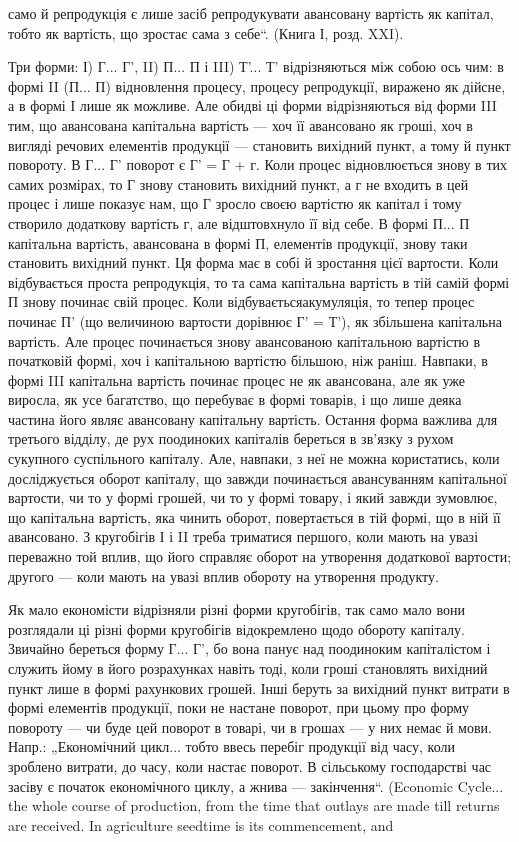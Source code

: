 само й репродукція є лише засіб репродукувати авансовану вартість
як капітал, тобто як вартість, що зростає сама з себе“. (Книга І,
розд. XXI).

Три форми: І) Г... Г', II) П... П і III) Т'... Т' відрізняються між
собою ось чим: в формі II (П... П) відновлення процесу, процесу репродукції,
виражено як дійсне, а в формі І лише як можливе. Але обидві ці
форми відрізняються від форми III тим, що авансована капітальна вартість
— хоч її авансовано як гроші, хоч в вигляді речових елементів продукції
— становить вихідний пункт, а тому й пункт повороту. В Г... Г' поворот
є Г' = Г + г. Коли процес відновлюється знову в тих самих розмірах,
то Г знову становить вихідний пункт, а г не входить в цей процес і лише
показує нам, що Г зросло своєю вартістю як капітал і тому створило додаткову
вартість г, але відштовхнуло її від себе. В формі П... П капітальна
вартість, авансована в формі П, елементів продукції, знову таки
становить вихідний пункт. Ця форма має в собі й зростання цієї вартости.
Коли відбувається проста репродукція, то та сама капітальна вартість
в тій самій формі П знову починає свій процес. Коли відбуваєтьсяакумуляція,
то тепер процес починає П' (що величиною вартости дорівнює
Г' = Т'), як збільшена капітальна вартість. Але процес починається знову
авансованою капітальною вартістю в початковій формі, хоч і капітальною
вартістю більшою, ніж раніш. Навпаки, в формі III капітальна вартість
починає процес не як авансована, але як уже виросла, як усе багатство,
що перебуває в формі товарів, і що лише деяка частина його являє
авансовану капітальну вартість. Остання форма важлива для третього
відділу, де рух поодиноких капіталів береться в зв’язку з рухом сукупного
суспільного капіталу. Але, навпаки, з неї не можна користатись,
коли досліджується оборот капіталу, що завжди починається авансуванням
капітальної вартости, чи то у формі грошей, чи то у формі товару, і
який завжди зумовлює, що капітальна вартість, яка чинить оборот, повертається
в тій формі, що в ній її авансовано. З кругобігів І і II
треба триматися першого, коли мають на увазі переважно той вплив, що
його справляє оборот на утворення додаткової вартости; другого — коли
мають на увазі вплив обороту на утворення продукту.

Як мало економісти відрізняли різні форми кругобігів, так само мало
вони розглядали ці різні форми кругобігів відокремлено щодо обороту
капіталу. Звичайно береться форму Г... Г', бо вона панує над поодиноким
капіталістом і служить йому в його розрахунках навіть тоді, коли
гроші становлять вихідний пункт лише в формі рахункових грошей. Інші
беруть за вихідний пункт витрати в формі елементів продукції, поки
не настане поворот, при цьому про форму повороту — чи буде цей поворот
в товарі, чи в грошах — у них немає й мови. Напр.: „Економічний
цикл... тобто ввесь перебіг продукції від часу, коли зроблено витрати,
до часу, коли настає поворот. В сільському господарстві час засіву є
початок економічного циклу, а жнива — закінчення“. (Economic Cycle...
the whole course of production, from the time that outlays are made till
returns are received. In agriculture seedtime is its commencement, and
